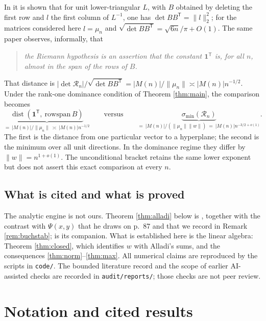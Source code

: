 \documentclass[11pt]{article}
\theoremstyle{definition}
\theoremstyle{remark}
\newcommand{\Rc}{\mathcal{R}}
\begin{document}
In \cite{kline588} it is shown that for unit lower-triangular $L$, with $B$
obtained by deleting the first row and $l$ the first column of $L^{-1}$, one has
$\det BB^{\mathsf T}=\|l\|_2^2$; for the matrices considered here $l=\mu_n$ and
$\sqrt{\det BB^{\mathsf T}}=\sqrt{6n}/\pi+O(1)$. The same paper observes,
informally, that
\begin{quote}
  \emph{the Riemann hypothesis is an assertion that the constant $\mathbf 1^{\mathsf
  T}$ is, for all $n$, almost in the span of the rows of $B$.}
\end{quote}
That distance is $|\det \Rc_n|/\sqrt{\det BB^{\mathsf T}} = |M(n)|/\|\mu_n\| \asymp
|M(n)|n^{-1/2}$. Under the rank-one dominance condition of Theorem
\ref{thm:main}, the comparison becomes
\begin{equation}\label{eq:compare}
  \underbrace{\operatorname{dist}(\mathbf 1^{\mathsf T},\ \mathrm{rowspan}\,B)}_{\textstyle
  =\ |M(n)|/\|\mu_n\|\ \asymp\ |M(n)|n^{-1/2}}
  \qquad\text{versus}\qquad
  \underbrace{\sigma_{\min}(\Rc_n)}_{\textstyle =\ |M(n)|/(\|\mu_n\|\|w\|)\ =\
  |M(n)|n^{-3/2+o(1)}} .
\end{equation}
The first is the distance from one particular vector to a hyperplane; the second
is the minimum over all unit directions. In the dominance regime they differ by
$\|w\|=n^{1+o(1)}$. The unconditional bracket retains the same lower exponent
but does not assert this exact comparison at every $n$.

\subsection{What is cited and what is proved}

The analytic engine is not ours. Theorem \ref{thm:alladi} below is
\cite[Thm.~1]{alladiJNT}, together with the contrast with $\Psi(x,y)$ that he
draws on p.~87 and that we record in Remark \ref{rem:buchstab};
\cite{alladiTAMS} is its companion. What is
established here is the linear algebra: Theorem \ref{thm:closed}, which identifies
$w$ with Alladi's sums, and the consequences \ref{thm:norm}--\ref{thm:max}. All
numerical claims are reproduced by the scripts in \texttt{code/}. The bounded
literature record and the scope of earlier AI-assisted checks are recorded in
\texttt{audit/reports/}; those checks are not peer review.

\section{Notation and cited results}\label{sec:prelim}
\end{document}
